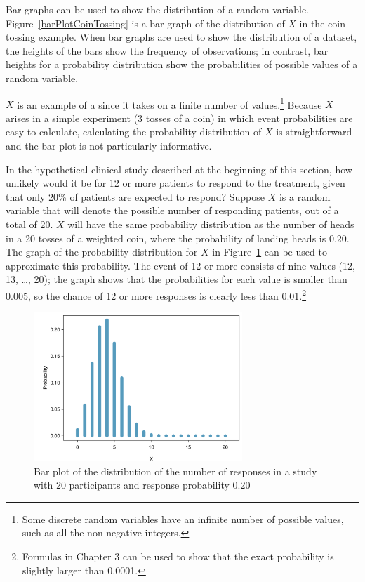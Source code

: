 Bar graphs can be used to show the distribution of a random variable.  Figure~\ref{barPlotCoinTossing} is a bar graph of the distribution of $X$ in the coin tossing example. When bar graphs are used to show the distribution of a dataset, the heights of the bars show the frequency of observations; in contrast, bar heights for a probability distribution show the probabilities of possible values of a random variable.

$X$ is an example of a  since it takes on a finite number of values.\footnote{Some discrete random variables have an infinite number of possible values, such as all the non-negative integers.} Because $X$ arises in a simple experiment (3 tosses of a coin) in which event probabilities are easy to calculate, calculating the probability distribution of $X$ is straightforward and the bar plot is not particularly informative.  

In the hypothetical clinical study described at the beginning of this section, how unlikely would it be for 12 or more patients to respond to the treatment, given that only 20\% of patients are expected to respond? Suppose $X$ is a random variable that will denote the possible number of responding patients, out of a total of 20. $X$ will have the same probability distribution as the number of heads in a 20 tosses of a weighted coin, where the probability of landing heads is 0.20. The graph of the probability distribution for $X$ in Figure~\ref{distRespClinStudy} can be used to approximate this probability. The event of 12 or more consists of nine values (12, 13, \dots, 20); the graph shows that the probabilities for each value is smaller than 0.005, so the chance of 12 or more responses is clearly less than 0.01.\footnote{Formulas in Chapter 3 can be used to show that the exact probability is slightly larger than 0.0001.}

\begin{figure}[h]
\centering
\includegraphics[width=0.70\textwidth]
{ch_probability_oi_biostat/figures/distRespClinStudy/distRespClinStudy.pdf}
\caption{Bar plot of the distribution of the number of responses in a study with 20 participants and response probability 0.20}
\label{distRespClinStudy}
\end{figure}

